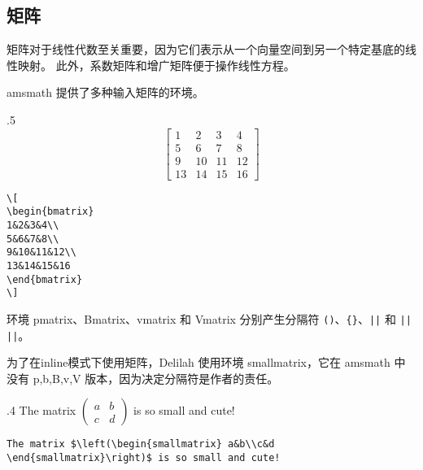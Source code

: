 \subsection{矩阵}
矩阵对于线性代数至关重要，因为它们表示从一个向量空间到另一个特定基底的线性映射。 此外，系数矩阵和增广矩阵便于操作线性方程。

amsmath 提供了多种输入矩阵的环境。
\begin{miniexammar}{.5\textandmarginlen}{
\[
\begin{bmatrix}
1&2&3&4\\
5&6&7&8\\
9&10&11&12\\
13&14&15&16
\end{bmatrix}
\]
}
\begin{lstlisting}
\[
\begin{bmatrix}
1&2&3&4\\
5&6&7&8\\
9&10&11&12\\
13&14&15&16
\end{bmatrix}
\]
\end{lstlisting}
\end{miniexammar}
环境 pmatrix、Bmatrix、vmatrix 和 Vmatrix 分别产生分隔符 \verb=()=、\verb={}=、\verb=||= 和 \verb=|| ||=。

为了在inline模式下使用矩阵，Delilah 使用环境 smallmatrix，它在 amsmath 中没有 p,b,B,v,V 版本，因为决定分隔符是作者的责任。
\begin{miniexammar}{.4\textandmarginlen}{
The matrix $\left(\begin{smallmatrix} a&b\\c&d \end{smallmatrix}\right)$ is so small and cute!
}
\begin{lstlisting}
The matrix $\left(\begin{smallmatrix} a&b\\c&d \end{smallmatrix}\right)$ is so small and cute!
\end{lstlisting}
\end{miniexammar}

